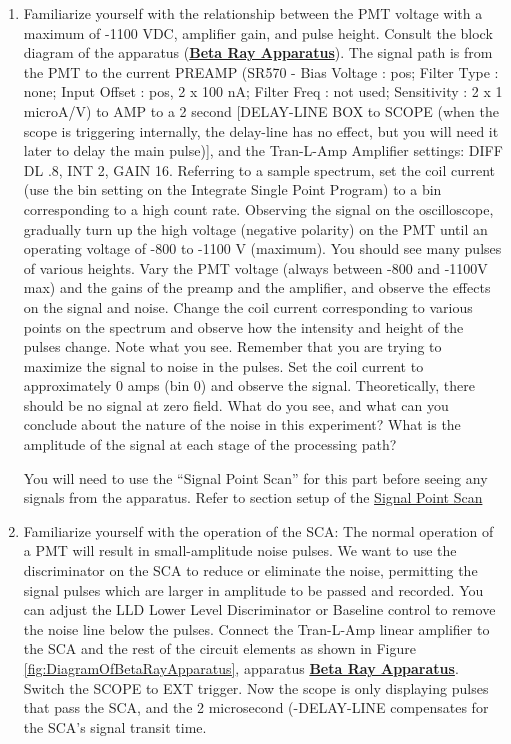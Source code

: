 \documentclass{../lab}
\begin{document}
\begin{enumerate}
    \item Familiarize yourself with the relationship between the PMT voltage with a maximum of -1100 VDC, amplifier gain, and pulse height. Consult the block diagram of the apparatus (\href{https://berkeley-physics111b.github.io/assets/pdf/oldwebsitestructure/images/BRAimage010.gif}{\textbf{Beta Ray Apparatus}}). The signal path is from the PMT to the current PREAMP (SR570 - Bias Voltage : pos; Filter Type : none; Input Offset : pos, 2 x 100 nA; Filter Freq : not used; Sensitivity : 2 x 1 microA/V) to AMP to a 2 second [DELAY-LINE BOX to SCOPE (when the scope is triggering internally, the delay-line has no effect, but you will need it later to delay the main pulse)], and the Tran-L-Amp Amplifier settings: DIFF DL .8, INT 2, GAIN 16. Referring to a sample spectrum, set the coil current (use the bin setting on the Integrate Single Point Program) to a bin corresponding to a high count rate. Observing the signal on the oscilloscope, gradually turn up the high voltage (negative polarity) on the PMT until an operating voltage of -800 to -1100 V (maximum). You should see many pulses of various heights. Vary the PMT voltage (always between -800 and -1100V max) and the gains of the preamp and the amplifier, and observe the effects on the signal and noise. Change the coil current corresponding to various points on the spectrum and observe how the intensity and height of the pulses change. Note what you see. Remember that you are trying to maximize the signal to noise in the pulses. Set the coil current to approximately 0 amps (bin 0) and observe the signal. Theoretically, there should be no signal at zero field. What do you see, and what can you conclude about the nature of the noise in this experiment? What is the amplitude of the signal at each stage of the processing path?

    You will need to use the ``Signal Point Scan'' for this part before seeing any signals from the apparatus. Refer to section setup of the \hyperref[subsec:IntegrateSinglePointProgram]{Signal Point Scan}

    \item Familiarize yourself with the operation of the SCA: The normal operation of a PMT will result in small-amplitude noise pulses. We want to use the discriminator on the SCA to reduce or eliminate the noise, permitting the signal pulses which are larger in amplitude to be passed and recorded. You can adjust the LLD Lower Level Discriminator or Baseline control to remove the noise line below the pulses. Connect the Tran-L-Amp linear amplifier to the SCA and the rest of the circuit elements as shown in Figure \ref{fig:DiagramOfBetaRayApparatus}, apparatus \href{https://berkeley-physics111b.github.io/assets/pdf/oldwebsitestructure/images/BRAimage010.gif}{\textbf{Beta Ray Apparatus}}. Switch the SCOPE to EXT trigger. Now the scope is only displaying pulses that pass the SCA, and the 2 microsecond (-DELAY-LINE compensates for the SCA's signal transit time.


\end{enumerate}
\end{document}
